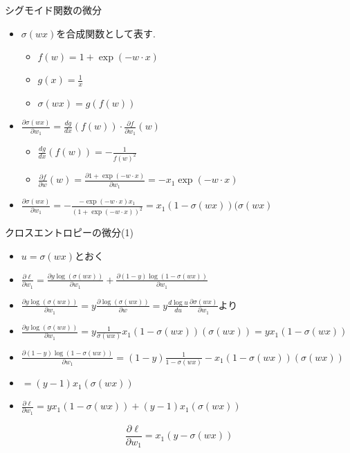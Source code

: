 \begin{frame}{シグモイド関数の微分}
  \begin{itemize}
\item $\sigma(wx)$を合成関数として表す.
  \begin{itemize}
  \item $f(w) = 1 + \exp(-w \cdot x)$
  \item $g(x) = \frac{1}{x}$
  \item $\sigma(wx) = g(f(w))$
  \end{itemize}
\item $\frac{\partial \sigma(wx)}{\partial w_1} = \frac{d g}{d x}(f(w)) \cdot \frac{\partial f}{\partial w_1}(w)$
  \begin{itemize}
  \item $\frac{d g}{d x}(f(w))  = - \frac{1}{f(w)^2}$
  \item $\frac{\partial f}{\partial w}(w) = \frac{\partial 1 + \exp( - w \cdot x)}{\partial w_1} = - x_1 \exp( - w \cdot x)$
  \end{itemize}
\item $\frac{\partial \sigma(wx)}{\partial w_1} = - \frac{ - \exp(- w \cdot x)x_1}{(1 + \exp(- w \cdot x))^2} = x_1 (1 - \sigma(wx))(\sigma(wx)$
\end{itemize}
\end{frame}

\begin{frame}{クロスエントロピーの微分(1)}
\begin{itemize}
\item $u = \sigma(wx)$とおく
\item $\frac{\partial \ell}{\partial w_1} =  \frac{\partial y \log(\sigma(wx))}{\partial w_1} + \frac{\partial (1-y) \log(1 - \sigma(wx))}{\partial w_1}$
\item $\frac{\partial y \log(\sigma(wx))}{\partial w_1} = y \frac{\partial \log(\sigma(wx))}{\partial w} =  y \frac{d \log u}{d u}\frac{\partial \sigma(wx)}{\partial w_1}$より
\item $\frac{\partial y \log(\sigma(wx))}{\partial w_1} = y \frac{1}{\sigma(wx)} x_1 (1 - \sigma(wx))(\sigma(wx))= yx_1(1 - \sigma(wx))$
\item $\frac{\partial (1-y) \log(1 - \sigma(wx))}{\partial w_1} =  (1 -y) \frac{1}{1 - \sigma(wx)} - x_1 (1 - \sigma(wx))(\sigma(wx))$
  \item $= (y - 1)x_1(\sigma(wx))$
\item $\frac{\partial \ell}{\partial w_1}  = yx_1(1 - \sigma(wx)) + (y - 1)x_1(\sigma(wx))$
\end{itemize}
$$
\frac{\partial \ell}{\partial w_1} = x_1(y - \sigma(wx))
$$
\end{frame}

